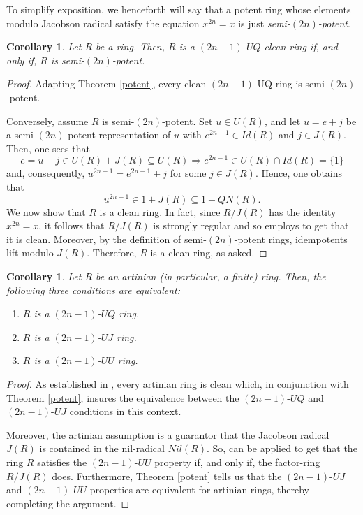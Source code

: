 \documentclass[12pt]{amsart}
\newtheorem{corollary}[theorem]{Corollary}
\theoremstyle{definition}
\begin{document}
To simplify exposition, we henceforth will say that a potent ring whose elements modulo Jacobson radical satisfy the equation $x^{2n}=x$ is just {\it semi-$(2n)$-potent}.

\begin{corollary}
Let $R$ be a ring. Then, $R$ is a $(2n-1)$-$UQ$ clean ring if, and only if, $R$ is semi-$(2n)$-potent.
\end{corollary}

\begin{proof}
Adapting Theorem \ref{potent}, every clean $(2n-1)$-UQ ring is semi-$(2n)$-potent.

Conversely, assume $R$ is semi-$(2n)$-potent. Set $u \in U(R)$, and let $u = e + j$ be a semi-$(2n)$-potent representation of $u$ with $e^{2n-1}\in Id(R)$ and $j\in J(R)$. Then, one sees that
\[
	e = u - j \in U(R) + J(R) \subseteq U(R) \Rightarrow e^{2n-1} \in U(R) \cap Id(R) = \{1\}
\]
and, consequently, $u^{2n-1} = e^{2n-1} + j$ for some $j\in J(R)$. Hence, one obtains that $$u^{2n-1}\in 1+J(R)\subseteq 1+QN(R).$$ We now show that $R$ is a clean ring. In fact, since $R/J(R)$ has the identity $x^{2n}=x$, it follows that $R/J(R)$ is strongly regular and so \cite[Theorem 1.1.2]{chenbook} employs to get that it is clean. Moreover, by the definition of semi-$(2n)$-potent rings, idempotents lift modulo $J(R)$. Therefore, $R$ is a clean ring, as asked.
\end{proof}

\begin{corollary}
Let $R$ be an artinian (in particular, a finite) ring. Then, the following three conditions are equivalent:
\begin{enumerate}
\item	
$R$ is a $(2n-1)$-$UQ$ ring.
\item	
$R$ is a $(2n-1)$-$UJ$ ring.
\item	
$R$ is a $(2n-1)$-$UU$ ring.
\end{enumerate}
\end{corollary}

\begin{proof}
As established in \cite[Corollary 6]{camilo}, every artinian ring is clean which, in conjunction with Theorem \ref{potent}, insures the equivalence between the $(2n-1)$-$UQ$ and $(2n-1)$-$UJ$ conditions in this context.

Moreover, the artinian assumption is a guarantor that the Jacobson radical $J(R)$ is contained in the nil-radical $Nil(R)$. So, \cite[Lemma 2.1]{10} can be applied to get that the ring $R$ satisfies the $(2n-1)$-$UU$ property if, and only if, the factor-ring $R/J(R)$ does. Furthermore, Theorem \ref{potent} tells us that the $(2n-1)$-$UJ$ and $(2n-1)$-$UU$ properties are equivalent for artinian rings, thereby completing the argument.
\end{proof}
\end{document}
